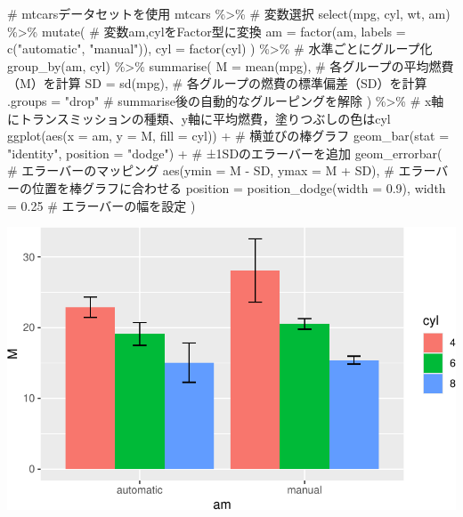 \documentclass[
  a4paper,
]{ltjsbook}
\newenvironment{Shaded}{\begin{snugshade}}{\end{snugshade}}
\newcommand{\AttributeTok}[1]{\textcolor[rgb]{0.40,0.45,0.13}{#1}}
\newcommand{\CommentTok}[1]{\textcolor[rgb]{0.37,0.37,0.37}{#1}}
\newcommand{\FloatTok}[1]{\textcolor[rgb]{0.68,0.00,0.00}{#1}}
\newcommand{\FunctionTok}[1]{\textcolor[rgb]{0.28,0.35,0.67}{#1}}
\newcommand{\NormalTok}[1]{\textcolor[rgb]{0.00,0.23,0.31}{#1}}
\newcommand{\SpecialCharTok}[1]{\textcolor[rgb]{0.37,0.37,0.37}{#1}}
\newcommand{\StringTok}[1]{\textcolor[rgb]{0.13,0.47,0.30}{#1}}
\begin{document}
\begin{Shaded}
\begin{Highlighting}[]
\CommentTok{\# mtcarsデータセットを使用}
\NormalTok{mtcars }\SpecialCharTok{\%\textgreater{}\%}
  \CommentTok{\# 変数選択}
  \FunctionTok{select}\NormalTok{(mpg, cyl, wt, am) }\SpecialCharTok{\%\textgreater{}\%}
  \FunctionTok{mutate}\NormalTok{(}
    \CommentTok{\# 変数am,cylをFactor型に変換}
    \AttributeTok{am =} \FunctionTok{factor}\NormalTok{(am, }\AttributeTok{labels =} \FunctionTok{c}\NormalTok{(}\StringTok{"automatic"}\NormalTok{, }\StringTok{"manual"}\NormalTok{)),}
    \AttributeTok{cyl =} \FunctionTok{factor}\NormalTok{(cyl)}
\NormalTok{  ) }\SpecialCharTok{\%\textgreater{}\%}
  \CommentTok{\# 水準ごとにグループ化}
  \FunctionTok{group\_by}\NormalTok{(am, cyl) }\SpecialCharTok{\%\textgreater{}\%}
  \FunctionTok{summarise}\NormalTok{(}
    \AttributeTok{M =} \FunctionTok{mean}\NormalTok{(mpg), }\CommentTok{\# 各グループの平均燃費（M）を計算}
    \AttributeTok{SD =} \FunctionTok{sd}\NormalTok{(mpg), }\CommentTok{\# 各グループの燃費の標準偏差（SD）を計算}
    \AttributeTok{.groups =} \StringTok{"drop"} \CommentTok{\# summarise後の自動的なグルーピングを解除}
\NormalTok{  ) }\SpecialCharTok{\%\textgreater{}\%}
  \CommentTok{\# x軸にトランスミッションの種類、y軸に平均燃費，塗りつぶしの色はcyl}
  \FunctionTok{ggplot}\NormalTok{(}\FunctionTok{aes}\NormalTok{(}\AttributeTok{x =}\NormalTok{ am, }\AttributeTok{y =}\NormalTok{ M, }\AttributeTok{fill =}\NormalTok{ cyl)) }\SpecialCharTok{+}
  \CommentTok{\# 横並びの棒グラフ}
  \FunctionTok{geom\_bar}\NormalTok{(}\AttributeTok{stat =} \StringTok{"identity"}\NormalTok{, }\AttributeTok{position =} \StringTok{"dodge"}\NormalTok{) }\SpecialCharTok{+}
  \CommentTok{\# ±1SDのエラーバーを追加}
  \FunctionTok{geom\_errorbar}\NormalTok{(}
    \CommentTok{\# エラーバーのマッピング}
    \FunctionTok{aes}\NormalTok{(}\AttributeTok{ymin =}\NormalTok{ M }\SpecialCharTok{{-}}\NormalTok{ SD, }\AttributeTok{ymax =}\NormalTok{ M }\SpecialCharTok{+}\NormalTok{ SD),}
    \CommentTok{\# エラーバーの位置を棒グラフに合わせる}
    \AttributeTok{position =} \FunctionTok{position\_dodge}\NormalTok{(}\AttributeTok{width =} \FloatTok{0.9}\NormalTok{),}
    \AttributeTok{width =} \FloatTok{0.25} \CommentTok{\# エラーバーの幅を設定}
\NormalTok{  )}
\end{Highlighting}
\end{Shaded}

\includegraphics{chapter04_files/figure-pdf/withHandlingGGplot-1.pdf}
\end{document}
